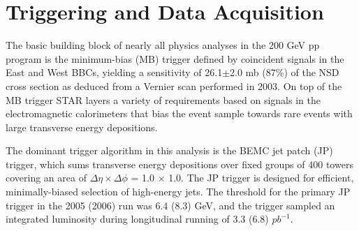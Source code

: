 \section{Triggering and Data Acquisition}

The basic building block of nearly all physics analyses in the 200 GeV pp
program is the minimum-bias (MB) trigger defined by coincident signals in the
East and West BBCs, yielding a sensitivity of 26.1$\pm$2.0 mb (87\%) of the
NSD cross section as deduced from a Vernier scan performed in 2003. On top of
the MB trigger STAR layers a variety of requirements based on signals in the
electromagnetic calorimeters that bias the event sample towards rare events
with large transverse energy depositions.

The dominant trigger algorithm in this analysis is the BEMC jet patch (JP)
trigger, which sums transverse energy depositions over fixed groups of 400
towers covering an area of $\Delta \eta \times \Delta \phi$ = 1.0 $\times$
1.0. The JP trigger is designed for efficient, minimally-biased selection of
high-energy jets. The threshold for the primary JP trigger in the 2005 (2006)
run was 6.4 (8.3) GeV, and the trigger sampled an integrated luminosity during
longitudinal running of 3.3 (6.8) $pb^{-1}$.







